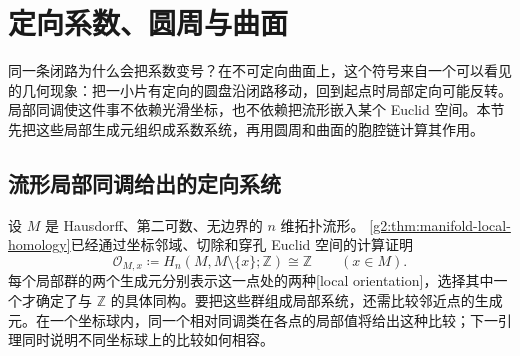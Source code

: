 
% 
% 

\section{定向系数、圆周与曲面}
\label{g2:sec:0503}

同一条闭路为什么会把系数变号？在不可定向曲面上，这个符号来自一个可以看见的几何现象：把一小片有定向的圆盘沿闭路移动，回到起点时局部定向可能反转。局部同调使这件事不依赖光滑坐标，也不依赖把流形嵌入某个 Euclid 空间。本节先把这些局部生成元组织成系数系统，再用圆周和曲面的胞腔链计算其作用。

\subsection{流形局部同调给出的定向系统}
\label{g2:subsec:0503:01}
设 \(M\) 是 Hausdorff、第二可数、无边界的 \(n\) 维拓扑流形。
\cref{g2:thm:manifold-local-homology}已经通过坐标邻域、切除和穿孔 Euclid 空间的计算证明
\[
	\mathcal O_{M,x}\coloneqq H_n(M,M\setminus\{x\};\mathbb Z)\cong\mathbb Z
	\qquad(x\in M).
\]
每个局部群的两个生成元分别表示这一点处的两种[local orientation]，选择其中一个才确定了与 \(\mathbb Z\) 的具体同构。要把这些群组成局部系统，还需比较邻近点的生成元。在一个坐标球内，同一个相对同调类在各点的局部值将给出这种比较；下一引理同时说明不同坐标球上的比较如何相容。

